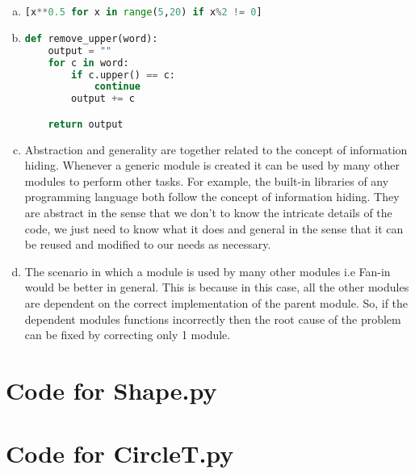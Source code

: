 \documentclass[12pt]{article}
\begin{document}
\begin{enumerate}[a)]
	\item \begin{lstlisting}[language=Python]
[x**0.5 for x in range(5,20) if x%2 != 0]
	\end{lstlisting}

	\item \begin{lstlisting}[language=Python]
def remove_upper(word):
    output = ""
    for c in word:
        if c.upper() == c:
            continue
        output += c

    return output
		  \end{lstlisting}

	\item Abstraction and generality are together related to the concept of information hiding. Whenever a generic module is created it can be used by many other modules to perform other tasks. For example, the built-in libraries of any programming language both follow the concept of information hiding. They are abstract in the sense that we don't to know the intricate details of the code, we just need to know what it does and general in the sense that it can be reused and modified to our needs as necessary.

	\item The scenario in which a module is used by many other modules i.e Fan-in would be better in general. This is because in this case, all the other modules are dependent on the correct implementation of the parent module. So, if the dependent modules functions incorrectly then the root cause of the problem can be fixed by correcting only 1 module. 

\end{enumerate}

\newpage

\lstset{language=Python, basicstyle=\tiny, breaklines=true, showspaces=false,
  showstringspaces=false, breakatwhitespace=true}

\def\thesection{\Alph{section}}

\section{Code for Shape.py}

\noindent 

\newpage

\section{Code for CircleT.py}
\end{document}
